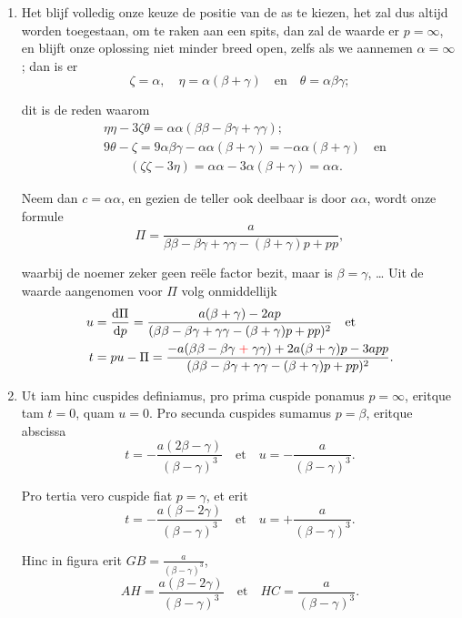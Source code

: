 \documentclass[10pt,a4paper]{article}
\newcommand{\switchenum}{\setcounter{enumi}{\arabic{enumi}-1}\switchcolumn}
\def\D{\mathrm{d}}
\begin{document}
\begin{paracol}{2}
\begin{enumerate}[topsep=1px]
		\switchenum
		\item Het blijf volledig onze keuze de positie van de as te kiezen, het zal dus altijd worden toegestaan, om te raken aan een spits, dan zal de waarde er $p=\infty$, en blijft onze oplossing niet minder breed open, zelfs als we aannemen $\alpha = \infty$; dan is er
		\[
			\zeta = \alpha, \quad \eta = \alpha(\beta+ \gamma)\quad \text{en}\quad  \theta = \alpha \beta \gamma;
		\]
		\par dit is de reden waarom
		\begin{align*}
			&\eta \eta - 3\zeta \theta = \alpha \alpha (\beta \beta - \beta \gamma + \gamma \gamma);\\
			&9\theta - \zeta = 9\alpha \beta \gamma - \alpha \alpha(\beta + \gamma) = - \alpha \alpha (\beta + \gamma)\quad \text{en}\\
			&\qquad (\zeta \zeta - 3\eta) = \alpha \alpha - 3\alpha (\beta + \gamma) = \alpha \alpha.
		\end{align*}
		\par Neem dan $c= \alpha \alpha$, en gezien de teller ook deelbaar is door $\alpha\alpha$, wordt onze formule
		\[
			\Pi = \frac{a}{\beta \beta -\beta \gamma+\gamma \gamma -(\beta + \gamma)p + pp},
		\]
		\par waarbij de noemer zeker geen reële factor bezit, maar is $\beta = \gamma$, \ldots
		Uit de waarde aangenomen voor $\Pi$ volg onmiddellijk
		\begin{align*}
			u &= \frac{\D \Pi}{\D p} = \frac{a(\beta + \gamma)-2ap}{(\beta \beta -\beta \gamma +\gamma \gamma - (\beta+\gamma)p+pp)^2} \quad \text{et}\\
			t & = pu - \Pi = \frac{-a(\beta \beta - \beta \gamma\;{\color{red}+}\;\gamma \gamma)+2a(\beta+\gamma)p -3app}{(\beta \beta - \beta \gamma + \gamma \gamma -(\beta + \gamma)p+pp)^2}.
		\end{align*}
		\switchcolumn*
		
		\item Ut iam hinc cuspides definiamus, pro prima cuspide ponamus $p = \infty$, eritque tam $t= 0$, quam $u=0$. Pro secunda cuspides sumamus $p=\beta$, eritque abscissa
		\[
			t = -\frac{a(2\beta- \gamma)}{(\beta - \gamma)^3} \quad \text{et} \quad u = - \frac{a}{(\beta-\gamma)^3}.
		\]
		\par Pro tertia vero cuspide fiat $p=\gamma$, et erit
		\[
			t = -\frac{a(\beta - 2\gamma)}{(\beta-\gamma)^3} \quad \text{et}\quad u = +\frac{a}{(\beta-\gamma)^3}.
		\]
		\par Hinc in figura erit $GB = \frac{a}{(\beta - \gamma)^3}$,
		\[
			AH = \frac{a(\beta - 2\gamma)}{(\beta - \gamma)^3} \quad \text{et}\quad HC = \frac{a}{(\beta - \gamma)^3}.
		\]
		

\end{enumerate}
\end{paracol}
\end{document}

